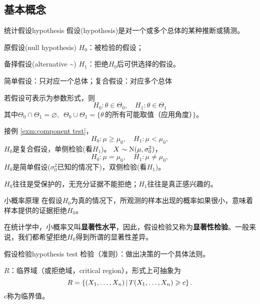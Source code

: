 \subsection{基本概念}
\begin{definition}{统计假设}{hypothesis}
	假设(hypothesis)是对一个或多个总体的某种推断或猜测。
	\begin{compactitem}
		\item 原假设(null hypothesis) $H_0$：被检验的假设；
		\item 备择假设(alternative \textasciitilde) $H_1$：拒绝$H_0$后可供选择的假设。
	\end{compactitem}
	简单假设：只对应一个总体；复合假设：对应多个总体
\end{definition}
若假设可表示为参数形式，则
\[
	H_0:\theta\in\varTheta_0,\quad H_1:\theta\in\varTheta_1
\]
其中$\varTheta_0\cap\varTheta_1=\varnothing,\enspace\varTheta_0\cup\varTheta_1=\{\theta\,\text{的所有可能取值（应用角度）\}}$。
\begin{example}{}{}
	接例 \ref{exm:component test}，
	\[
		H_0:\mu\geqslant\mu_0,\quad H_1:\mu<\mu_0,
	\]
	$H_0$是复合假设，单侧检验(看$H_1$)。
	\tcblower
	$X\sim\operatorname{N}(\mu,\sigma_0^2)$，
	\[
		H_0:\mu=\mu_0,\quad H_1:\mu\neq\mu_0,
	\]
	$H_0$是简单假设($\sigma_0^2$已知的情况下)，双侧检验(看$H_1$)。
\end{example}

$H_0$往往是受保护的，无充分证据不能拒绝；$H_1$往往是真正感兴趣的。
\begin{theorem}{小概率原理}{}
	在假设$H_0$为真的情况下，所观测的样本出现的概率如果很小，意味着样本提供的证据拒绝$H_0$。
\end{theorem}
在统计学中，小概率又叫\textbf{显著性水平}，因此，假设检验又称为\textbf{显著性检验}。一般来说，我们都希望拒绝$H_0$得到所谓的显著性差异。
\begin{definition}{假设检验}{hypothesis test}
	检验（准则）：做出决策的一个具体法则。

	$R$：临界域（或拒绝域，critical region），形式上可抽象为
	\[
		R=\left\{(X_1,\ldots,X_n)\,\middle\vert\,T(X_1,\ldots,X_n)\geqslant c\right\}.
	\]
	$c$称为临界值。
\end{definition}

